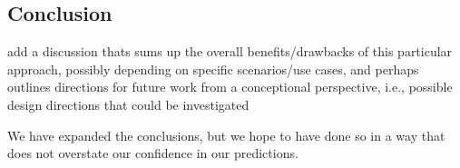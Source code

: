\documentclass[12pt,a4paper,preprint]{article}
\begin{document}
\subsection*{Conclusion}

\begin{blockquote}
add a discussion thats sums up the overall benefits/drawbacks of this
particular approach, possibly depending on specific scenarios/use cases, and
perhaps outlines directions for future work from a conceptional perspective,
i.e., possible design directions that could be investigated
\end{blockquote}

We have expanded the conclusions, but we hope to have done so in a way
that does not overstate our confidence in our predictions.
\end{document}
